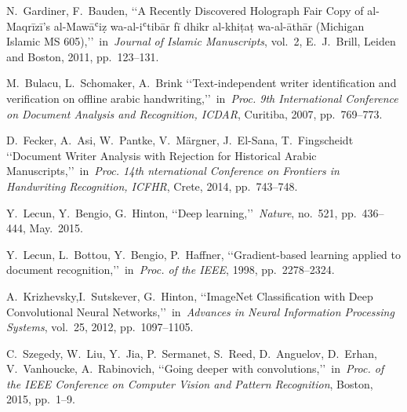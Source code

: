 \documentclass[conference,a4paper,twocolumn]{IEEEtran}
\begin{document}

%
%
%

\begin{thebibliography}{99}

 N.~Gardiner, F.~Bauden, \lq\lq A Recently Discovered Holograph Fair Copy of al-Maqrīzī’s al-Mawāʿiẓ wa-al-iʿtibār fī dhikr al-khiṭaṭ wa-al-āthār (Michigan Islamic MS 605),\rq\rq~in~\emph{Journal of Islamic Manuscripts}, vol.~2, E.~J.~Brill, Leiden and Boston, 2011, pp.~123--131.

 M.~Bulacu, L.~Schomaker, A.~Brink \lq\lq Text-independent writer identification and verification on offline arabic handwriting,\rq\rq~in~\emph{Proc. 9th International Conference on Document Analysis and Recognition, ICDAR}, Curitiba, 2007, pp.~769--773.

 D.~Fecker, A.~Asi, W.~Pantke, V.~Märgner, J.~El-Sana, T.~Fingscheidt \lq\lq Document Writer Analysis with Rejection for Historical Arabic Manuscripts,\rq\rq~in~\emph{Proc. 14th nternational Conference on Frontiers in Handwriting Recognition, ICFHR}, Crete, 2014, pp.~743--748.

 Y.~Lecun, Y.~Bengio, G.~Hinton, \lq\lq Deep learning,\rq\rq~\emph{Nature}, no.~521, pp.~436--444, May.~2015.

 Y.~Lecun, L.~Bottou, Y.~Bengio, P.~Haffner, \lq\lq Gradient-based learning applied to document recognition,\rq\rq~in~\emph{Proc. of the IEEE}, 1998, pp.~2278--2324.

 A.~Krizhevsky,I.~Sutskever, G.~Hinton, \lq\lq ImageNet Classification with Deep Convolutional Neural Networks,\rq\rq~in~\emph{Advances in Neural Information Processing Systems}, vol.~25, 2012, pp.~1097--1105.

 C.~Szegedy, W.~Liu, Y.~Jia, P.~Sermanet, S.~Reed, D.~Anguelov, D.~Erhan, V.~Vanhoucke, A.~Rabinovich, \lq\lq Going deeper with convolutions,\rq\rq~in~\emph{Proc. of the IEEE Conference on Computer Vision and Pattern Recognition}, Boston, 2015, pp.~1--9.


\end{thebibliography}
\end{document}
